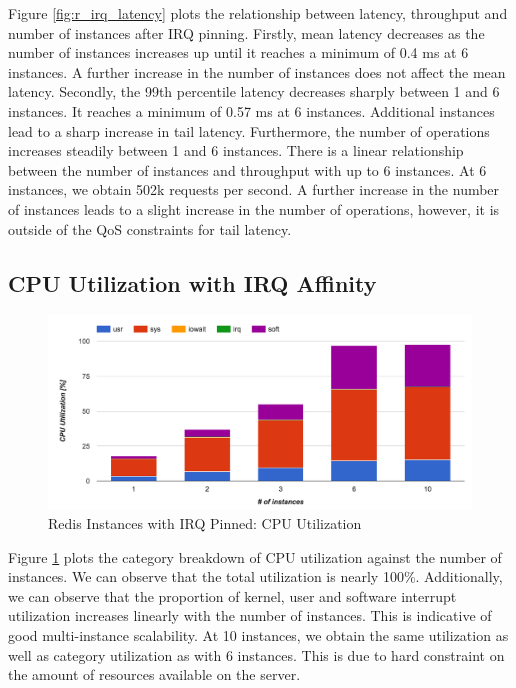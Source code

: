 Figure \ref{fig:r_irq_latency} plots the relationship between latency, throughput and number of instances after IRQ pinning. Firstly, mean latency decreases as the number of instances increases up until it reaches a minimum of 0.4 ms at 6 instances. A further increase in the number of instances does not affect the mean latency. Secondly, the 99th percentile latency decreases sharply between 1 and 6 instances. It reaches a minimum of 0.57 ms at 6 instances. Additional instances lead to a sharp increase in tail latency. Furthermore, the number of operations increases steadily between 1 and 6 instances. There is a linear relationship between the number of instances and throughput with up to 6 instances. At 6 instances, we obtain 502k requests per second. A further increase in the number of instances leads to a slight increase in the number of operations, however, it is outside of the QoS constraints for tail latency.

\subsection{CPU Utilization with IRQ Affinity}
\begin{figure}[h]
    \includegraphics[width=\textwidth]{./res2/r_irq_cpu.png}
    \caption{Redis Instances with IRQ Pinned: CPU Utilization}
    \label{fig:r_irq_cpu}
\end{figure}

Figure \ref{fig:r_irq_cpu} plots the category breakdown of CPU utilization against the number of instances. We can observe that the total utilization is nearly 100\%. Additionally, we can observe that the proportion of kernel, user and software interrupt utilization increases linearly with the number of instances. This is indicative of good multi-instance scalability. At 10 instances, we obtain the same utilization as well as category utilization as with 6 instances. This is due to hard constraint on the amount of resources available on the server.

